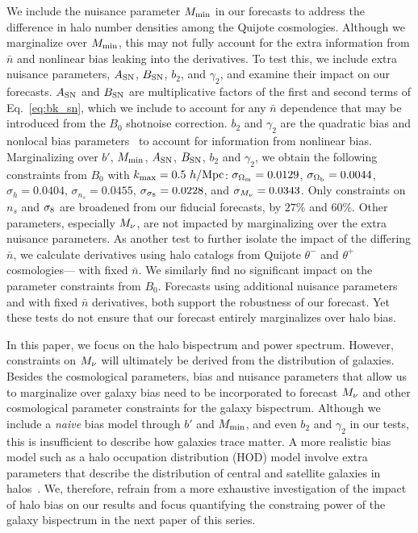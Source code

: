 We include the nuisance parameter $M_{\rm min}$ in our forecasts to address the 
difference in halo number densities among the Quijote cosmologies. Although 
we marginalize over $M_{\rm min}$, this may not fully account for the extra 
information from $\bar{n}$ and nonlinear bias leaking into the derivatives. 
To test this, we include extra nuisance parameters, $A_{\rm SN}$, 
$B_{\rm SN}$, $b_2$, and $\gamma_2$, and examine their impact on our forecasts. 
$A_{\rm SN}$ and $B_{\rm SN}$ are multiplicative factors of the first and
second terms of Eq.~\ref{eq:bk_sn}, which we include to account for any 
$\bar{n}$ dependence that may be introduced from the $B_0$ shotnoise correction. 
$b_2$ and $\gamma_2$ are the quadratic bias and nonlocal bias 
parameters~\citep{chan2012, sheth2013} to account for information from 
nonlinear bias. Marginalizing over $b'$, $M_{\rm min}$, $A_{\rm SN}$, $B_{\rm SN}$, 
$b_2$ and $\gamma_2$, we obtain the following constraints from $B_0$ 
with $k_{\rm max} = 0.5~h/{\rm Mpc}$:
$\sigma_{\Omega_{\rm m}} = 0.0129$, $\sigma_{\Omega_{\rm b}} = 0.0044$, $\sigma_h=0.0404$, 
$\sigma_{n_s}=0.0455$, $\sigma_{\sigma_8}=0.0228$, and $\sigma_{M_\nu}=0.0343$. 
Only constraints on $n_s$ and $\sigma_8$ are broadened from our fiducial 
forecasts, by $27\%$ and $60\%$. Other parameters, especially $M_\nu$, 
are not impacted by marginalizing over the extra nuisance parameters. 
As another test to further isolate the impact of the differing $\bar{n}$, 
we calculate derivatives using halo catalogs from Quijote $\theta^{-}$ 
and $\theta^{+}$ cosmologies--- with fixed $\bar{n}$. We similarly find 
no significant impact on the parameter constraints from $B_0$. Forecasts 
using additional nuisance parameters and with fixed $\bar{n}$ derivatives, 
both support the robustness of our forecast. Yet these tests do not 
ensure that our forecast entirely marginalizes over halo bias. 

In this paper, we focus on the halo bispectrum and power spectrum. However,   
constraints on $M_\nu$ will ultimately be derived from the distribution of 
galaxies. Besides the cosmological parameters, bias and nuisance parameters 
that allow us to marginalize over galaxy bias need to be incorporated to 
forecast $M_\nu$ and other cosmological parameter constraints for the 
galaxy bispectrum. Although we include a \emph{naive} bias model through $b'$ 
and $M_{\rm min}$, and even $b_2$ and $\gamma_2$ in our tests, this is 
insufficient to describe how galaxies trace matter. A more realistic bias model 
such as a halo occupation distribution (HOD) model involve extra parameters 
that describe the distribution of central and satellite galaxies in 
halos~\citep[\emph{e.g.}][]{zheng2005,leauthaud2012a,tinker2013,zentner2016,vakili2019}. 
We, therefore, refrain from a more exhaustive investigation of the impact of 
halo bias on our results and focus quantifying the constraing power of 
the galaxy bispectrum in the next paper of this series. 

